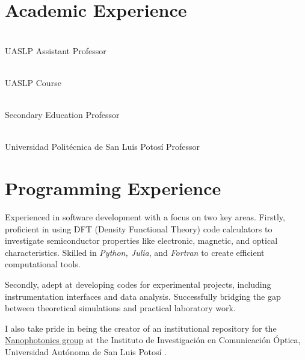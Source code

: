 \documentclass[letterpaper,dvipsnames]{twentysecondcv} %
\begin{document}
\section{Academic Experience}

\begin{twenty} %
	{\\UASLP}
	{Assistant Professor}
	
	{\\UASLP}
	{Course}
	
	{\\Secondary Education}
	{Professor}
	
	
	{\\Universidad Politécnica de San Luis Potosí}
	{Professor}
	
\end{twenty}

\section{Programming Experience}

Experienced in software development with a focus on two key areas. Firstly, proficient in using DFT (Density Functional Theory) code calculators to investigate semiconductor properties like electronic, magnetic, and optical characteristics. Skilled in \emph{Python, Julia}, and \emph{Fortran} to create efficient computational tools.

Secondly, adept at developing codes for experimental projects, including instrumentation interfaces and data analysis. Successfully bridging the gap between theoretical simulations and practical laboratory work.

I also take pride in being the creator of an institutional repository for the \href{https://github.com/NanophotonIICOs}{Nanophotonics group} at the Instituto de Investigaci\'on en Comunicaci\'on \'Optica, Universidad Aut\'onoma de San Luis Potos\'i .
\end{document}
